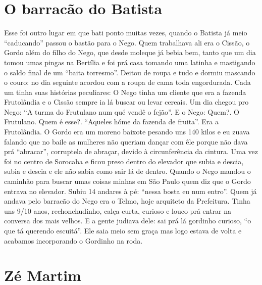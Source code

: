\documentclass[12pt,brazil,]{book}
\begin{document}
\section{O barracão do Batista}\label{o-barracuxe3o-do-batista}

Esse foi outro lugar em que bati ponto muitas vezes, quando o Batista já
meio ``caducando'' passou o bastão para o Nego. Quem trabalhava ali era
o Cissão, o Gordo além do filho do Nego, que desde moleque já bebia bem,
tanto que um dia tomou umas pingas na Bertília e foi prá casa tomando
uma latinha e mastigando o saldo final de um ``baita torresmo''. Deitou
de roupa e tudo e dormiu mascando o couro: no dia seguinte acordou com a
roupa de cama toda engordurada. Cada um tinha suas histórias peculiares:
O Nego tinha um cliente que era a fazenda Frutolândia e o Cissão sempre
ia lá buscar ou levar cereais. Um dia chegou pro Nego: ``A turma do
Frutulano num qué vendê o fejão''. E o Nego: Quem?. O Frutulano. Quem é
esse?. ``Aqueles hóme da fazenda de fruita''. Era a Frutolândia. O Gordo
era um moreno baixote pesando uns 140 kilos e eu zuava falando que no
baile as mulheres não queriam dançar com êle porque não dava prá
``abracar'', corruptela de abraçar, devido à circunferência da cintura.
Uma vez foi no centro de Sorocaba e ficou preso dentro do elevador que
subia e descia, subia e descia e ele não sabia como sair lá de dentro.
Quando o Nego mandou o caminhão para buscar umas coisas minhas em São
Paulo quem diz que o Gordo entrava no elevador. Subiu 14 andares à pé:
``nessa bosta eu num entro''. Quem já andava pelo barracão do Nego era o
Telmo, hoje arquiteto da Prefeitura. Tinha uns 9/10 anos,
rechonchudinho, calça curta, curioso e louco prá entrar na conversa dos
mais velhos. E a gente judiava dele: sai prá lá gordinho curioso, ``o
que tá querendo escuitá''. Ele saia meio sem graça mas logo estava de
volta e acabamos incorporando o Gordinho na roda.

\section{Zé Martim}\label{zuxe9-martim}
\end{document}
